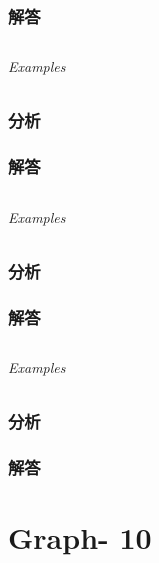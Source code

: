 \documentclass[UTF8,a4paper,12pt]{ctexbook}
\begin{document}
	\subsection{解答}
	
\section{}
	
	\subparagraph{Examples}
	
	\subsection{分析}
	
	\subsection{解答}
	
	
\section{}
	
	\subparagraph{Examples}
	
	\subsection{分析}
	
	\subsection{解答}
	
\section{}
	
	\subparagraph{Examples}
	
	\subsection{分析}
	
	\subsection{解答}
\chapter{Graph- 10}
\section{}
	
\end{document}
